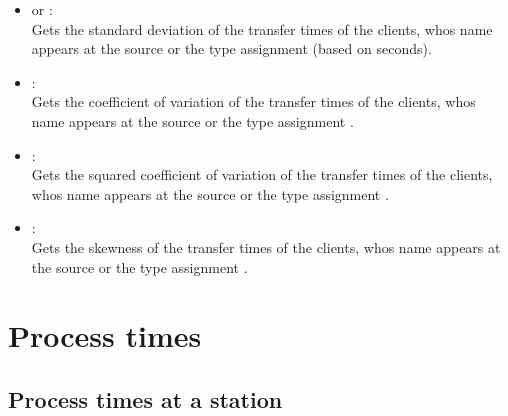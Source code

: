 \begin{itemize}
\item
{} or :\\
Gets the standard deviation of the transfer times of the clients, whos name appears at the source or the type assignment  (based on seconds).

\item
{}:\\
Gets the coefficient of variation of the transfer times of the clients, whos name appears at the source or the type assignment .

\item
{}:\\
Gets the squared coefficient of variation of the transfer times of the clients, whos name appears at the source or the type assignment .

\item
{}:\\
Gets the skewness of the transfer times of the clients, whos name appears at the source or the type assignment .

\end{itemize}



\section{Process times}



\subsection{Process times at a station}

